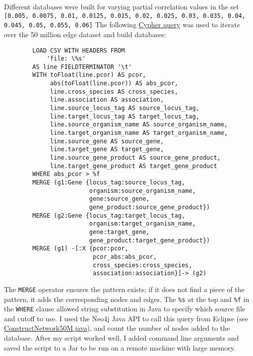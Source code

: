 \documentclass[12pt]{article}
\begin{document}
Different databases were built for varying partial correlation values in the set \texttt{[0.005,  0.0075,  0.01,  0.0125,  0.015,  0.02,  0.025,  0.03,  0.035,  0.04,  0.045,  0.05,  0.055,  0.06]}
The following \href{https://github.com/JanetMatsen/Neo4j_meta4/blob/master/data_mining_Neo4j_v2_3_2/queries/load_network--specify_cutoff.txt}{Cypher query} was used to iterate over the 50 million edge dataset and build databases:

\begin{verbatim}
        LOAD CSV WITH HEADERS FROM
            'file: \%s'
        AS line FIELDTERMINATOR '\t'
        WITH toFloat(line.pcor) AS pcor,
             abs(toFloat(line.pcor)) AS abs_pcor,
             line.cross_species AS cross_species,
             line.association AS association,
             line.source_locus_tag AS source_locus_tag,
             line.target_locus_tag AS target_locus_tag,
             line.source_organism_name AS source_organism_name,
             line.target_organism_name AS target_organism_name,
             line.source_gene AS source_gene,
             line.target_gene AS target_gene,
             line.source_gene_product AS source_gene_product,
             line.target_gene_product AS target_gene_product
        WHERE abs_pcor > %f
        MERGE (g1:Gene {locus_tag:source_locus_tag,
                        organism:source_organism_name,
                        gene:source_gene,
                        gene_product:source_gene_product})
        MERGE (g2:Gene {locus_tag:target_locus_tag,
                        organism:target_organism_name,
                        gene:target_gene,
                        gene_product:target_gene_product})
        MERGE (g1) -[:X {pcor:pcor,
                         pcor_abs:abs_pcor,
                         cross_species:cross_species,
                         association:association}]-> (g2)
\end{verbatim}

The \texttt{MERGE} operator ensures the pattern exists; if it does not find a piece of the pattern, it adds the corresponding nodes and edges. 
The \texttt{\%s} at the top and \texttt{\%f} in the \texttt{WHERE} clause allowed string substitution in Java to specify which source file and cutoff to use. 
I used the Neo4j Java API to call this query from Eclipse (see \href{https://github.com/JanetMatsen/Neo4j_meta4/blob/master/data_mining_Neo4j_v2_3_2/src/ConstructNetwork50M.java}{ConstructNetwork50M.java}), and count the number of nodes added to the database. 
After my script worked well, I added command line arguments and saved the script to a Jar to be run on a remote machine with large memory.
\end{document}
